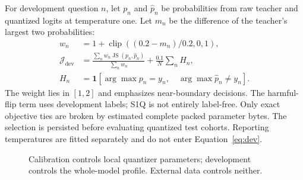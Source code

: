 \documentclass[10pt,twocolumn]{article}
\newcommand{\clip}{\operatorname{clip}}
\newcommand{\JS}{\operatorname{JS}}
\begin{document}
For development question $n$, let $p_n$ and $\widehat p_n$ be probabilities
from raw teacher and quantized logits at temperature one. Let $m_n$ be
the difference of the teacher's largest two probabilities:
\begin{align}
 w_n&=1+\clip((0.2-m_n)/0.2,0,1),\\
 \mathcal J_{\mathrm{dev}}
 &=\frac{\sum_n w_n\JS(p_n,\widehat p_n)}{\sum_n w_n}
   +\frac{0.1}{N}\sum_n H_n ,
 \label{eq:dev}\\
 H_n&=\mathbf 1[
   \arg\max p_n=y_n,\quad
   \arg\max\widehat p_n\ne y_n].
\end{align}
The weight lies in $[1,2]$ and emphasizes near-boundary decisions.
The harmful-flip term uses development labels; S1Q is not entirely
label-free. Only exact objective ties are broken by estimated complete
packed parameter bytes. The selection is persisted before evaluating
quantized test cohorts. Reporting temperatures are fitted separately
and do not enter Equation~\eqref{eq:dev}.

\begin{figure}[t]
\small
{}
\caption{Calibration controls local quantizer parameters; development
controls the whole-model profile. External data controls neither.}
\label{fig:algorithm}
\end{figure}
\end{document}
